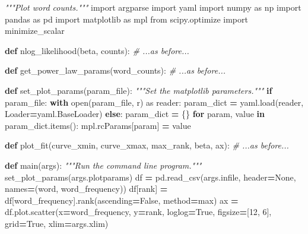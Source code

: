 \documentclass[
]{krantz}
\makeatletter
\newenvironment{Shaded}{\begin{snugshade}}{\end{snugshade}}
\newcommand{\BuiltInTok}[1]{#1}
\newcommand{\CommentTok}[1]{\textcolor[rgb]{0.56,0.35,0.01}{\textit{#1}}}
\newcommand{\ControlFlowTok}[1]{\textcolor[rgb]{0.13,0.29,0.53}{\textbf{#1}}}
\newcommand{\DecValTok}[1]{\textcolor[rgb]{0.00,0.00,0.81}{#1}}
\newcommand{\ImportTok}[1]{#1}
\newcommand{\KeywordTok}[1]{\textcolor[rgb]{0.13,0.29,0.53}{\textbf{#1}}}
\newcommand{\NormalTok}[1]{#1}
\newcommand{\OperatorTok}[1]{\textcolor[rgb]{0.81,0.36,0.00}{\textbf{#1}}}
\newcommand{\StringTok}[1]{\textcolor[rgb]{0.31,0.60,0.02}{#1}}
\newcommand{\VariableTok}[1]{\textcolor[rgb]{0.00,0.00,0.00}{#1}}
\newenvironment{kframe}{%
\medskip{}
\setlength{\fboxsep}{.8em}
 \def\at@end@of@kframe{}%
 \ifinner\ifhmode%
  \def\at@end@of@kframe{\end{minipage}}%
  \begin{minipage}{\columnwidth}%
 \fi\fi%
 \def\FrameCommand##1{\hskip\@totalleftmargin \hskip-\fboxsep
 \colorbox{shadecolor}{##1}\hskip-\fboxsep
     \hskip-\linewidth \hskip-\@totalleftmargin \hskip\columnwidth}%
 \MakeFramed {\advance\hsize-\width
   \@totalleftmargin\z@ \linewidth\hsize
   \@setminipage}}%
 {\par\unskip\endMakeFramed%
 \at@end@of@kframe}
\renewenvironment{Shaded}{\begin{kframe}}{\end{kframe}}
\makeatother
\begin{document}
\begin{Shaded}
\begin{Highlighting}[]
\CommentTok{"""Plot word counts."""}
\ImportTok{import}\NormalTok{ argparse}
\ImportTok{import}\NormalTok{ yaml}
\ImportTok{import}\NormalTok{ numpy }\ImportTok{as}\NormalTok{ np}
\ImportTok{import}\NormalTok{ pandas }\ImportTok{as}\NormalTok{ pd}
\ImportTok{import}\NormalTok{ matplotlib }\ImportTok{as}\NormalTok{ mpl}
\ImportTok{from}\NormalTok{ scipy.optimize }\ImportTok{import}\NormalTok{ minimize\_scalar}


\KeywordTok{def}\NormalTok{ nlog\_likelihood(beta, counts):}
    \CommentTok{\# ...as before...}


\KeywordTok{def}\NormalTok{ get\_power\_law\_params(word\_counts):}
    \CommentTok{\# ...as before...}


\KeywordTok{def}\NormalTok{ set\_plot\_params(param\_file):}
    \CommentTok{"""Set the matplotlib parameters."""}
    \ControlFlowTok{if}\NormalTok{ param\_file:}
        \ControlFlowTok{with} \BuiltInTok{open}\NormalTok{(param\_file, }\StringTok{\textquotesingle{}r\textquotesingle{}}\NormalTok{) }\ImportTok{as}\NormalTok{ reader:}
\NormalTok{            param\_dict }\OperatorTok{=}\NormalTok{ yaml.load(reader, Loader}\OperatorTok{=}\NormalTok{yaml.BaseLoader)}
    \ControlFlowTok{else}\NormalTok{:}
\NormalTok{        param\_dict }\OperatorTok{=}\NormalTok{ \{\}}
    \ControlFlowTok{for}\NormalTok{ param, value }\KeywordTok{in}\NormalTok{ param\_dict.items():}
\NormalTok{        mpl.rcParams[param] }\OperatorTok{=}\NormalTok{ value}


\KeywordTok{def}\NormalTok{ plot\_fit(curve\_xmin, curve\_xmax, max\_rank, beta, ax):}
    \CommentTok{\# ...as before...}


\KeywordTok{def}\NormalTok{ main(args):}
    \CommentTok{"""Run the command line program."""}
\NormalTok{    set\_plot\_params(args.plotparams)}
\NormalTok{    df }\OperatorTok{=}\NormalTok{ pd.read\_csv(args.infile, header}\OperatorTok{=}\VariableTok{None}\NormalTok{, names}\OperatorTok{=}\NormalTok{(}\StringTok{\textquotesingle{}word\textquotesingle{}}\NormalTok{, }\StringTok{\textquotesingle{}word\_frequency\textquotesingle{}}\NormalTok{))}
\NormalTok{    df[}\StringTok{\textquotesingle{}rank\textquotesingle{}}\NormalTok{] }\OperatorTok{=}\NormalTok{ df[}\StringTok{\textquotesingle{}word\_frequency\textquotesingle{}}\NormalTok{].rank(ascending}\OperatorTok{=}\VariableTok{False}\NormalTok{, method}\OperatorTok{=}\StringTok{\textquotesingle{}max\textquotesingle{}}\NormalTok{)}
\NormalTok{    ax }\OperatorTok{=}\NormalTok{ df.plot.scatter(x}\OperatorTok{=}\StringTok{\textquotesingle{}word\_frequency\textquotesingle{}}\NormalTok{, y}\OperatorTok{=}\StringTok{\textquotesingle{}rank\textquotesingle{}}\NormalTok{, loglog}\OperatorTok{=}\VariableTok{True}\NormalTok{,}
\NormalTok{                         figsize}\OperatorTok{=}\NormalTok{[}\DecValTok{12}\NormalTok{, }\DecValTok{6}\NormalTok{], grid}\OperatorTok{=}\VariableTok{True}\NormalTok{, xlim}\OperatorTok{=}\NormalTok{args.xlim)}


\end{Highlighting}
\end{Shaded}
\end{document}
